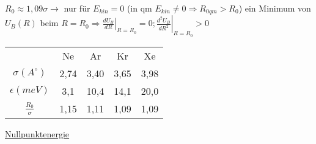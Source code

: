 \(R_0\approx 1,09\sigma\rightarrow\) nur für \(E_{kin}=0\) (in qm \(E_{kin}\neq
0\Rightarrow R_{0qm}>R_0\)) ein Minimum von \(U_B(R)\) beim
\(R=R_0\Rightarrow\left.\frac{dU_B}{dR}\right|_{R=R_0}=0;\left.\frac{d^2U_B}{dR^2}\right|_{R=R_0}>0\)

\begin{tabular}{c|cccc}
&Ne&Ar&Kr&Xe \\
\(\sigma(A^{\circ})\)&2,74&3,40&3,65&3,98 \\
\(\epsilon(meV)\)&3,1&10,4&14,1&20,0 \\
\(\frac {R_0} \sigma\)&1,15&1,11&1,09&1,09
\end{tabular}

\underline{Nullpunktenergie}


